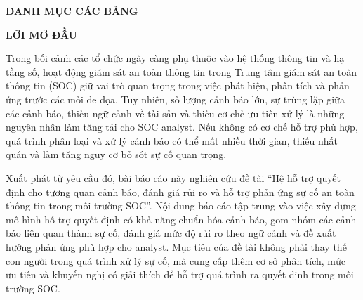 \documentclass[a4paper,12pt,oneside]{book}
\begin{document}
{}

\vspace{0.5cm}
\normalsize

{\fontsize{13pt}{15.6pt}\selectfont
    \renewcommand{\listfigurename}{}
    \listoffigures
}

\clearpage
\thispagestyle{empty}

\begin{center}
    {\Large \textbf{DANH MỤC CÁC BẢNG}}
\end{center}

{}

\vspace{0.5cm}
\normalsize

{\fontsize{13pt}{15.6pt}\selectfont
    \renewcommand{\listtablename}{}
    \listoftables
}

\clearpage


\begin{center}
  {\fontsize{16pt}{20pt}\selectfont \textbf{LỜI MỞ ĐẦU}}
\end{center}
{}

{\fontsize{13pt}{15.6pt}\selectfont

Trong bối cảnh các tổ chức ngày càng phụ thuộc vào hệ thống thông tin và hạ tầng số, hoạt động giám sát an toàn thông tin trong Trung tâm giám sát an toàn thông tin (SOC) giữ vai trò quan trọng trong việc phát hiện, phân tích và phản ứng trước các mối đe dọa. Tuy nhiên, số lượng cảnh báo lớn, sự trùng lặp giữa các cảnh báo, thiếu ngữ cảnh về tài sản và thiếu cơ chế ưu tiên xử lý là những nguyên nhân làm tăng tải cho SOC analyst. Nếu không có cơ chế hỗ trợ phù hợp, quá trình phân loại và xử lý cảnh báo có thể mất nhiều thời gian, thiếu nhất quán và làm tăng nguy cơ bỏ sót sự cố quan trọng.

Xuất phát từ yêu cầu đó, bài báo cáo này nghiên cứu đề tài ``Hệ hỗ trợ quyết định cho tương quan cảnh báo, đánh giá rủi ro và hỗ trợ phản ứng sự cố an toàn thông tin trong môi trường SOC''. Nội dung báo cáo tập trung vào việc xây dựng mô hình hỗ trợ quyết định có khả năng chuẩn hóa cảnh báo, gom nhóm các cảnh báo liên quan thành sự cố, đánh giá mức độ rủi ro theo ngữ cảnh và đề xuất hướng phản ứng phù hợp cho analyst. Mục tiêu của đề tài không phải thay thế con người trong quá trình xử lý sự cố, mà cung cấp thêm cơ sở phân tích, mức ưu tiên và khuyến nghị có giải thích để hỗ trợ quá trình ra quyết định trong môi trường SOC.

}
\end{document}
